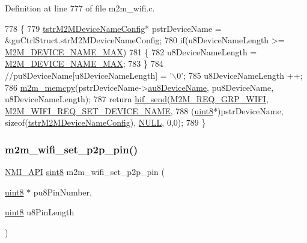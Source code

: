 Definition at line 777 of file m2m\+\_\+wifi.\+c.


\begin{DoxyCode}
778 \{
779     \hyperlink{structtstrM2MDeviceNameConfig}{tstrM2MDeviceNameConfig}* pstrDeviceName = &guCtrlStruct.strM2MDeviceNameConfig;
780     \textcolor{keywordflow}{if}(u8DeviceNameLength >= \hyperlink{group__WlanDefines_ga13694b7fb6c7afefab58c38a43aa1957}{M2M\_DEVICE\_NAME\_MAX})
781     \{
782         u8DeviceNameLength = \hyperlink{group__WlanDefines_ga13694b7fb6c7afefab58c38a43aa1957}{M2M\_DEVICE\_NAME\_MAX};
783     \}
784     \textcolor{comment}{//pu8DeviceName[u8DeviceNameLength] = '\(\backslash\)0';}
785     u8DeviceNameLength ++;
786     \hyperlink{nm__common_8h_a62b30b611dfcc58e190254d1f663470a}{m2m\_memcpy}(pstrDeviceName->\hyperlink{structtstrM2MDeviceNameConfig_a0b580031f6f989a230cc78f0cb6fb2ce}{au8DeviceName}, pu8DeviceName, u8DeviceNameLength);
787     \textcolor{keywordflow}{return} \hyperlink{m2m__hif_8c_a13ba8ad11b2ac39516ca787386d16ce0}{hif\_send}(\hyperlink{nm__common_8h_a9ab02eb1aea02a75c3f5aade4eef1276aeb9a7d57324ba4b8a6c2a5f46dd499c2}{M2M\_REQ\_GRP\_WIFI}, 
      \hyperlink{group__WlanEnums_gga57466b36df595c593e7ccc9892e14b20a9c8b2c2704ec40baffa44f95e1e3a88e}{M2M\_WIFI\_REQ\_SET\_DEVICE\_NAME},
788         (\hyperlink{group__DataT_ga4df709a77647e870bbf1d955b8edc9a6}{uint8}*)pstrDeviceName, \textcolor{keyword}{sizeof}(\hyperlink{structtstrM2MDeviceNameConfig}{tstrM2MDeviceNameConfig}), 
      \hyperlink{group__BSPDefine_ga070d2ce7b6bb7e5c05602aa8c308d0c4}{NULL}, 0,0);
789 \}
\end{DoxyCode}
\mbox{\label{group__WlanEnums_gac93d56dc53ba0a5a02b669c800b7ae62}} 
\subsubsection{\texorpdfstring{m2m\+\_\+wifi\+\_\+set\+\_\+p2p\+\_\+pin()}{m2m\_wifi\_set\_p2p\_pin()}}
{\footnotesize\ttfamily \hyperlink{group__BSPDefine_gaecc0323d771e41ef81a76b5f12783e22}{N\+M\+I\+\_\+\+A\+PI} \hyperlink{group__DataT_gae35f10ffd0ac8dd2bc3e794da9bdfbc7}{sint8} m2m\+\_\+wifi\+\_\+set\+\_\+p2p\+\_\+pin (\begin{DoxyParamCaption}\item[{\hyperlink{group__DataT_ga4df709a77647e870bbf1d955b8edc9a6}{uint8} $\ast$}]{pu8\+Pin\+Number,  }\item[{\hyperlink{group__DataT_ga4df709a77647e870bbf1d955b8edc9a6}{uint8}}]{u8\+Pin\+Length }\end{DoxyParamCaption})}



